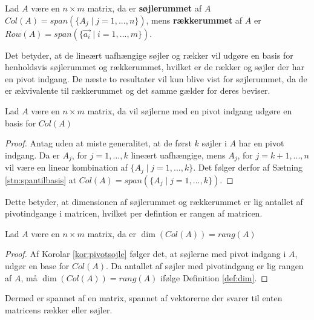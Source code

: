 \begin{defn}
Lad $A$ være en $n\times m$ matrix, da er \textbf{søjlerummet} af $A$ $Col (A) = span(\{A_j \mid j =1,...,n\})$, mens \textbf{rækkerummet} af $A$ er $Row (A) = span(\{\vec{a_i} \mid i=1,...,m\})$.
\label{def:sojlerum}
\end{defn} 
Det betyder, at de lineært uafhængige søjler og rækker vil udgøre en basis for henholdsvis søjlerummet og rækkerummet, hvilket er de rækker og søjler der har en pivot indgang. 
De næste to resultater vil kun blive vist for søjlerummet, da de er ækvivalente til rækkerummet og det samme gælder for deres beviser.
\begin{kor}
Lad $A$ være en $n \times m$ matrix, da vil søjlerne med en pivot indgang udgøre en basis for $Col (A)$
\label{kor:pivotsojle}
\end{kor}
\begin{proof}
Antag uden at miste generalitet, at de først $k$ søjler i $A$ har en pivot indgang.
Da er $A_j$, for $j=1,...,k$ lineært uafhængige, mens $A_j$, for $j = k+1,...,n$ vil være en linear kombination af $\{A_j \mid j = 1,...,k\}$. 
Det følger derfor af Sætning \ref{stn:spantilbasis} at $Col (A) = span(\{A_j \mid j=1,...,k\})$.
\end{proof}
Dette betyder, at dimensionen af søjlerummet og rækkerummet er lig antallet af pivotindgange i matricen, hvilket per defintion er rangen af matricen.
\begin{kor}
Lad $A$ være en $n\times m $ matrix, da er $\dim(Col (A)) = rang (A)$
\end{kor}
\begin{proof}
Af Korolar \ref{kor:pivotsojle} følger det, at søjlerne med pivot indgang i $A$, udgør en base for $Col (A)$. 
Da antallet af søjler med pivotindgang er lig rangen af $A$, må $\dim(Col (A)) = rang (A)$ ifølge Definition \ref{def:dim}.
\end{proof}
Dermed er spannet af en matrix, spannet af vektorerne der svarer til enten matricens rækker eller søjler.
